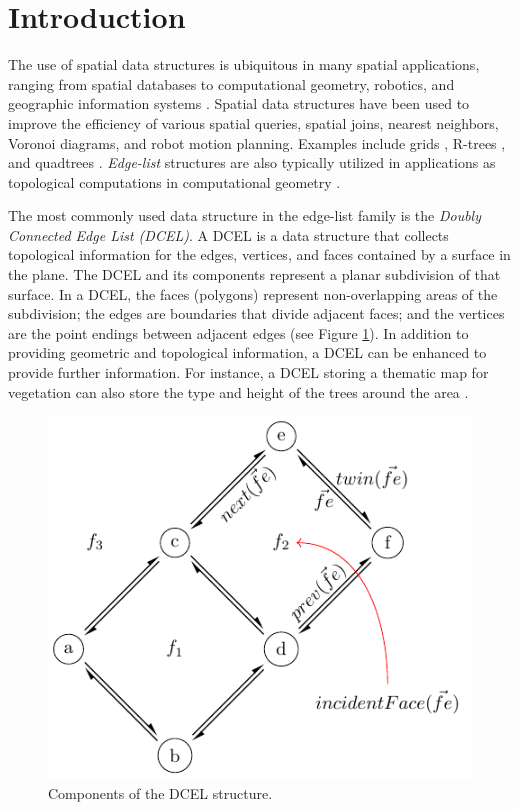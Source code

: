 \section{Introduction}

The use of spatial data structures is ubiquitous in many spatial applications, ranging from spatial databases to computational geometry, robotics, and geographic information systems \cite{samet_design_1990}. Spatial data structures have been used to improve the efficiency of various spatial queries, spatial joins, nearest neighbors, Voronoi diagrams, and robot motion planning. Examples include grids \cite{nievergelt_grid_1984}, R-trees \cite{guttman_r-trees_1984, beckmann_r-tree_1990}, and quadtrees \cite{finkel_quadtrees_1974}.  \textit{Edge-list} structures are also typically utilized in applications as topological computations in computational geometry \cite{berg_computational_2008}.

The most commonly used data structure in the edge-list family is the \textit{Doubly Connected Edge List (DCEL)}. A DCEL \cite{muller_finding_1978, preparata_computational_1985} is a data structure that collects topological information for the edges, vertices, and faces contained by a surface in the plane. The DCEL and its components represent a planar subdivision of that surface. In a DCEL, the faces (polygons) represent non-overlapping areas of the subdivision; the edges are boundaries that divide adjacent faces; and the vertices are the point endings between adjacent edges (see Figure \ref{fig:dcel_example}).  In addition to providing geometric and topological information, a DCEL can be enhanced to provide further information. For instance, a DCEL storing a thematic map for vegetation can also store the type and height of the trees around the area \cite{berg_computational_2008}.

\begin{figure}
    \centering
    \includegraphics[width=0.6\linewidth]{chapterSDCEL/dcel_example}
    \caption{Components of the DCEL structure.}\label{fig:dcel_example}
\end{figure}

